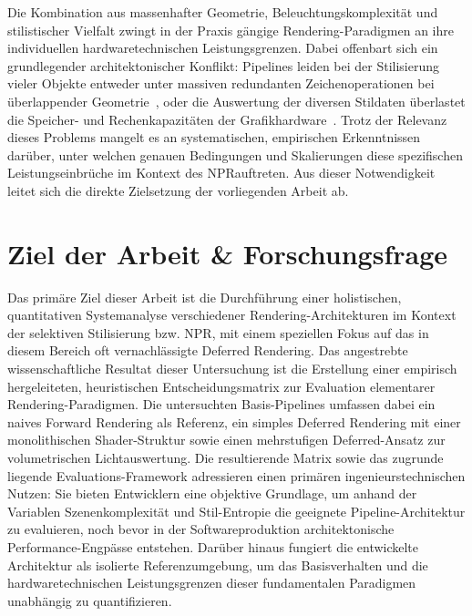Die Kombination aus massenhafter Geometrie, Beleuchtungskomplexität und stilistischer Vielfalt zwingt in der Praxis
gängige Rendering-Paradigmen an ihre individuellen hardwaretechnischen Leistungsgrenzen.
Dabei offenbart sich ein grundlegender architektonischer Konflikt: Pipelines leiden bei der Stilisierung vieler Objekte
entweder unter massiven redundanten Zeichenoperationen bei überlappender
Geometrie~\cite[Abschn.~1]{fatahalianReducingShadingGPUs2010}, oder die Auswertung der diversen Stildaten
überlastet die Speicher- und Rechenkapazitäten der
Grafikhardware~\cite[Abschn.~6]{schiedDeferredAttributeInterpolation2015}.
Trotz der Relevanz dieses Problems mangelt es an systematischen, empirischen Erkenntnissen darüber, unter welchen
genauen Bedingungen und Skalierungen diese spezifischen Leistungseinbrüche im Kontext des \ac{NPR}auftreten.
Aus dieser Notwendigkeit leitet sich die direkte Zielsetzung der vorliegenden Arbeit ab.


\section{Ziel der Arbeit \& Forschungsfrage}
\label{sec:0101_goal_and_core_question}

Das primäre Ziel dieser Arbeit ist die Durchführung einer holistischen, quantitativen Systemanalyse verschiedener
Rendering-Architekturen im Kontext der selektiven Stilisierung bzw. \ac{NPR}, mit einem speziellen Fokus auf das in diesem
Bereich oft vernachlässigte Deferred Rendering.
Das angestrebte wissenschaftliche Resultat dieser Untersuchung ist die Erstellung einer empirisch hergeleiteten,
heuristischen Entscheidungsmatrix zur Evaluation elementarer Rendering-Paradigmen.
Die untersuchten Basis-Pipelines umfassen dabei ein naives Forward Rendering als Referenz, ein simples Deferred
Rendering mit einer monolithischen Shader-Struktur sowie einen mehrstufigen Deferred-Ansatz zur volumetrischen
Lichtauswertung.
Die resultierende Matrix sowie das zugrunde liegende Evaluations-Framework adressieren einen primären
ingenieurstechnischen Nutzen:
Sie bieten Entwicklern eine objektive Grundlage, um anhand der Variablen Szenenkomplexität und Stil-Entropie die
geeignete Pipeline-Architektur zu evaluieren, noch bevor in der Softwareproduktion architektonische Performance-Engpässe
entstehen.
Darüber hinaus fungiert die entwickelte Architektur als isolierte Referenzumgebung, um das Basisverhalten und die
hardwaretechnischen Leistungsgrenzen dieser fundamentalen Paradigmen unabhängig zu quantifizieren.

